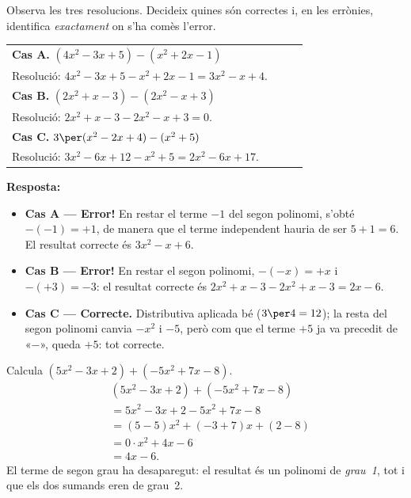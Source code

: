 \begin{exemple}
Observa les tres resolucions. Decideix quines són correctes i, en les
errònies, identifica \emph{exactament} on s'ha comès l'error.

\medskip
\begin{tabular}{@{}p{0.90\linewidth}@{}}
\textbf{Cas A.} $(4x^2 - 3x + 5) - (x^2 + 2x - 1)$ \\
\quad Resolució: $4x^2-3x+5-x^2+2x-1 = 3x^2-x+4$. \\[5pt]
\textbf{Cas B.} $(2x^2 + x - 3) - (2x^2 - x + 3)$ \\
\quad Resolució: $2x^2+x-3-2x^2-x+3 = 0$. \\[5pt]
\textbf{Cas C.} $3\per(x^2 - 2x + 4) - (x^2 + 5)$ \\
\quad Resolució: $3x^2-6x+12-x^2+5 = 2x^2-6x+17$.
\end{tabular}

\medskip
\textbf{Resposta:}
\begin{itemize}[leftmargin=1.4em, itemsep=2pt]
  \item \textbf{Cas A — Error!} En restar el terme $-1$ del segon polinomi,
        s'obté $-(-1)=+1$, de manera que el terme independent hauria de
        ser $5+1=6$. El resultat correcte és $3x^2-x+6$.
  \item \textbf{Cas B — Error!} En restar el segon polinomi, $-(-x)=+x$ i
        $-(+3)=-3$: el resultat correcte és $2x^2+x-3-2x^2+x-3=2x-6$.
  \item \textbf{Cas C — Correcte.} Distributiva aplicada bé ($3\per 4=12$);
        la resta del segon polinomi canvia $-x^2$ i $-5$, però com que el
        terme $+5$ ja va precedit de «$-$», queda $+5$: tot correcte.
\end{itemize}
\end{exemple}

\begin{exemple}
Calcula $(5x^2 - 3x + 2) + (-5x^2 + 7x - 8)$.
\begin{align*}
&(5x^2-3x+2)+(-5x^2+7x-8) \\
&= 5x^2-3x+2-5x^2+7x-8 \\
&= (5-5)x^2 + (-3+7)x + (2-8) \\
&= 0 \cdot x^2 + 4x - 6 \\
&= 4x - 6.
\end{align*}
El terme de segon grau ha desaparegut: el resultat és un polinomi de
\emph{grau~1}, tot i que els dos sumands eren de grau~2.
\end{exemple}

